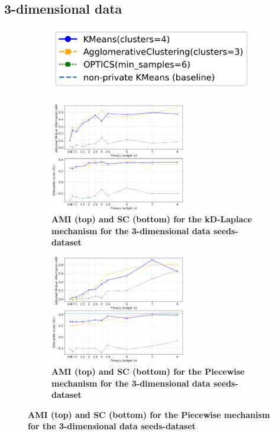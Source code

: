 \subsection{3-dimensional data}
\begin{figure}[H]
      \centering
      \begin{subfigure}{0.30\textwidth}
            \includegraphics[width=\textwidth]{Results/kd-laplace/kd-Laplace/seeds-dataset/legend_3.png}
      \end{subfigure}
      \begin{subfigure}{1\textwidth}
            \caption{\textbf{AMI (top) and SC (bottom) for the kD-Laplace mechanism for the 3-dimensional data seeds-dataset}}
            \includegraphics[width=0.65\textwidth]{Results/kd-laplace/kd-Laplace/seeds-dataset/ami-and-sc_3_dimensions.png}
            \centering
      \end{subfigure}
      \begin{subfigure}{1\textwidth}
            \caption{\textbf{AMI (top) and SC (bottom) for the Piecewise mechanism for the 3-dimensional data seeds-dataset}}
            \centering
            \includegraphics[width=0.65\textwidth]{Results/kd-laplace/piecewise/seeds-dataset/ami-and-sc_3_dimensions.png}
      \end{subfigure}
      \label{fig:validation-seeds-dataset_comparison_3d-laplace}
\end{figure}
